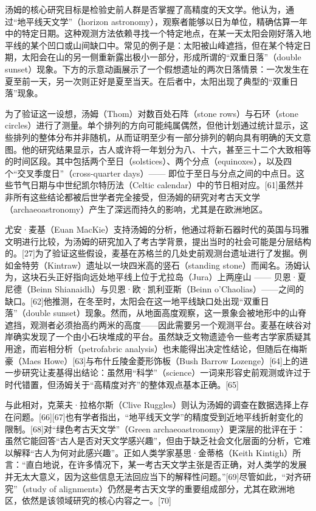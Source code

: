 汤姆的核心研究目标是检验史前人群是否掌握了高精度的天文学。他认为，通过“地平线天文学”（horizon astronomy），观察者能够以日为单位，精确估算一年中的特定日期。这种观测方法依赖寻找一个特定地点，在某一天太阳会刚好落入地平线的某个凹口或山间缺口中。常见的例子是：太阳被山峰遮挡，但在某个特定日期，太阳会在山的另一侧重新露出极小一部分，形成所谓的“双重日落”（double sunset）现象。下方的示意动画展示了一个假想遗址的两次日落情景：一次发生在夏至前一天，另一次则正好是夏至当天。在后者中，太阳出现了典型的“双重日落”现象。

为了验证这一设想，汤姆（Thom）对数百处石阵（stone rows）与石环（stone circles）进行了测量。单个排列的方向可能纯属偶然，但他计划通过统计显示，这些排列的整体分布并非随机，从而证明至少有一部分排列的朝向具有明确的天文意图。他的研究结果显示，古人或许将一年划分为八、十六，甚至三十二个大致相等的时间区段。其中包括两个至日（solstices）、两个分点（equinoxes），以及四个“交叉季度日”（cross-quarter days）—— 即位于至日与分点之间的中点日。这些节气日期与中世纪凯尔特历法（Celtic calendar）中的节日相对应。[61]虽然并非所有这些结论都被后世学者完全接受，但汤姆的研究对考古天文学（archaeoastronomy）产生了深远而持久的影响，尤其是在欧洲地区。

尤安·麦基（Euan MacKie）支持汤姆的分析，他通过将新石器时代的英国与玛雅文明进行比较，为汤姆的研究加入了考古学背景，提出当时的社会可能是分层结构的。[27]为了验证这些假设，麦基在苏格兰的几处史前观测台遗址进行了发掘。例如金特劳（Kintraw）遗址以一块四米高的竖石（standing stone）而闻名。汤姆认为，这块石头正好指向远处地平线上位于尤拉岛（Jura）上两座山 —— 贝恩·夏尼德（Beinn Shianaidh）与贝恩·欧·凯利亚斯（Beinn o’Chaolias）——之间的缺口。[62]他推测，在冬至时，太阳会在这一地平线缺口处出现“双重日落”（double sunset）现象。然而，从地面高度观察，这一景象会被地形中的山脊遮挡，观测者必须抬高约两米的高度——因此需要另一个观测平台。麦基在峡谷对岸确实发现了一个由小石块堆成的平台。虽然缺乏文物遗迹令一些考古学家质疑其用途，而岩相分析（petrofabric analysis）也未能得出决定性结论，但随后在梅斯豪（Maes Howe）[63]与布什丘陵金菱形饰板（Bush Barrow Lozenge）[64]上的进一步研究让麦基得出结论：虽然用“科学”（science）一词来形容史前观测或许过于时代错置，但汤姆关于“高精度对齐”的整体观点基本正确。[65]

与此相对，克莱夫·拉格尔斯（Clive Ruggles）则认为汤姆的调查在数据选择上存在问题。[66][67]也有学者指出，“地平线天文学”的精度受到近地平线折射变化的限制。[68]对“绿色考古天文学”（Green archaeoastronomy）更深层的批评在于：虽然它能回答“古人是否对天文学感兴趣”，但由于缺乏社会文化层面的分析，它难以解释“古人为何对此感兴趣”。正如人类学家基思·金蒂格（Keith Kintigh）所言：“直白地说，在许多情况下，某一考古天文学主张是否正确，对人类学的发展并无太大意义，因为这些信息无法回应当下的解释性问题。”[69]尽管如此，“对齐研究”（study of alignments）仍然是考古天文学的重要组成部分，尤其在欧洲地区，依然是该领域研究的核心内容之一。[70]
